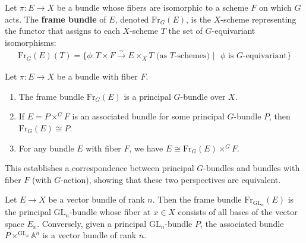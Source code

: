 \documentclass[12pt]{article}
\begin{document}
\begin{definition}
Let $\pi: E \to X$ be a bundle whose fibers are isomorphic to a scheme $F$ on which $G$ acts. The \textbf{frame bundle} of $E$, denoted $\text{Fr}_G(E)$, is the $X$-scheme representing the functor that assigns to each $X$-scheme $T$ the set of $G$-equivariant isomorphisms:
\begin{align*}
\text{Fr}_G(E)(T) = \{\phi: T \times F \stackrel{\sim}{\to} E \times_X T \text{ (as $T$-schemes) } | \text{ $\phi$ is $G$-equivariant}\}
\end{align*}
\end{definition}

\begin{proposition}
Let $\pi: E \to X$ be a bundle with fiber $F$.
\begin{enumerate}
\item The frame bundle $\text{Fr}_G(E)$ is a principal $G$-bundle over $X$.
\item If $E = P \times^G F$ is an associated bundle for some principal $G$-bundle $P$, then $\text{Fr}_G(E) \cong P$.
\item For any bundle $E$ with fiber $F$, we have $E \cong \text{Fr}_G(E) \times^G F$.
\end{enumerate}
\end{proposition}

This establishes a correspondence between principal $G$-bundles and bundles with fiber $F$ (with $G$-action), showing that these two perspectives are equivalent.

\begin{example}
Let $E \to X$ be a vector bundle of rank $n$. Then the frame bundle $\text{Fr}_{\text{GL}_n}(E)$ is the principal $\text{GL}_n$-bundle whose fiber at $x \in X$ consists of all bases of the vector space $E_x$. Conversely, given a principal $\text{GL}_n$-bundle $P$, the associated bundle $P \times^{\text{GL}_n} \mathbb{A}^n$ is a vector bundle of rank $n$.
\end{example}
\end{document}
